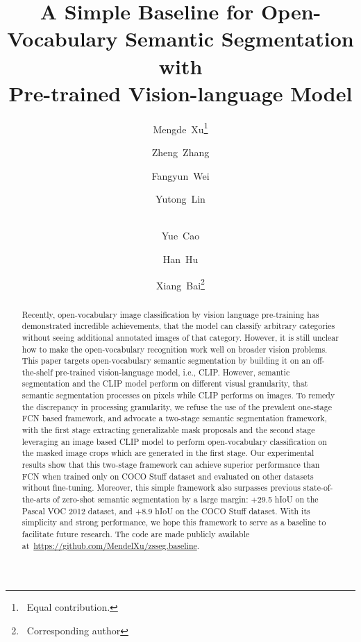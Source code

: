 \documentclass[runningheads]{llncs}
\begin{document}
\pagestyle{headings}
\mainmatter
\def\ECCVSubNumber{6275}  

\authorrunning{ }
\titlerunning{ }
\title{A Simple Baseline for Open-Vocabulary Semantic Segmentation with \\Pre-trained Vision-language Model} \author{
Mengde~Xu\thanks{~Equal contribution.} \and 
Zheng~Zhang \and 
Fangyun~Wei \and 
Yutong~Lin \and \\
Yue~Cao \and
Han~Hu \and
Xiang~Bai\thanks{~Corresponding author}
}





\maketitle

\begin{abstract}
Recently, open-vocabulary image classification by vision language pre-training has demonstrated incredible achievements, that the model can classify arbitrary categories without seeing additional annotated images of that category. However, it is still unclear how to make the open-vocabulary recognition work well on broader vision problems. This paper targets open-vocabulary semantic segmentation by building it on an off-the-shelf pre-trained vision-language model, i.e., CLIP. However, semantic segmentation and the CLIP model perform on different visual granularity, that semantic segmentation processes on pixels while CLIP performs on images. To remedy the discrepancy in processing granularity, we refuse the use of the prevalent one-stage FCN based framework, and advocate a two-stage semantic segmentation framework, with the first stage extracting generalizable mask proposals and the second stage leveraging an image based CLIP model to perform open-vocabulary classification on the masked image crops which are generated in the first stage. Our experimental results show that this two-stage framework can achieve superior performance than FCN when trained only on COCO Stuff dataset and evaluated on other datasets without fine-tuning. Moreover, this simple framework also surpasses previous state-of-the-arts of zero-shot semantic segmentation by a large margin: +29.5 hIoU on the Pascal VOC 2012 dataset, and +8.9 hIoU on the COCO Stuff dataset. With its simplicity and strong performance, we hope this framework to serve as a baseline to facilitate future research. The code are made publicly available at~\url{https://github.com/MendelXu/zsseg.baseline}. 
\end{abstract}
\end{document}
